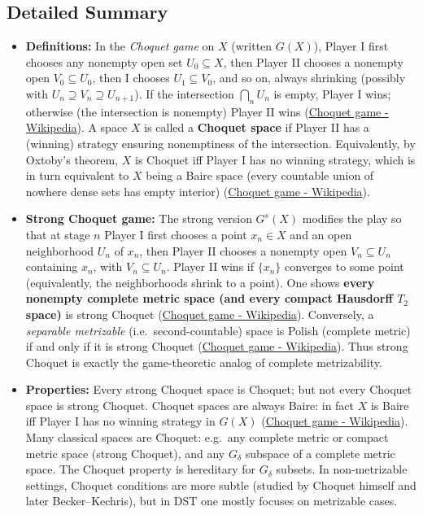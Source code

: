 \documentclass[11pt]{article}
\begin{document}
\subsection{Detailed Summary}
\label{detailed-summary-2}
\begin{itemize}
\item \textbf{Definitions:} In the \emph{Choquet game} on \(X\) (written \(G(X)\)),
Player I first chooses any nonempty open set \(U_0\subseteq X\), then
Player II chooses a nonempty open \(V_0\subseteq U_0\), then I chooses
\(U_1\subseteq V_0\), and so on, always shrinking (possibly with
\(U_n\supseteq V_n\supseteq U_{n+1}\)). If the intersection
\(\bigcap_{n}U_n\) is empty, Player I wins; otherwise (the
intersection is nonempty) Player II wins
(\href{https://en.wikipedia.org/wiki/Choquet\_game\#:\~:text=,wins\%2C\%20otherwise\%20Player\%20II\%20wins}{Choquet
game - Wikipedia}). A space \(X\) is called a \textbf{Choquet space} if
Player II has a (winning) strategy ensuring nonemptiness of the
intersection. Equivalently, by Oxtoby's theorem, \(X\) is Choquet iff
Player I has no winning strategy, which is in turn equivalent to \(X\)
being a Baire space (every countable union of nowhere dense sets has
empty interior)
(\href{https://en.wikipedia.org/wiki/Choquet\_game\#:\~:text=if\%20Player\%20I\%20has\%20no,that\%20are}{Choquet
game - Wikipedia}).

\item \textbf{Strong Choquet game:} The strong version \(G^s(X)\) modifies the play
so that at stage \(n\) Player I first chooses a point \(x_n\in X\) and
an open neighborhood \(U_n\) of \(x_n\), then Player II chooses a
nonempty open \(V_n\subseteq U_n\) containing \(x_n\), with
\(V_n\subseteq U_n\). Player II wins if \(\{x_n\}\) converges to some
point (equivalently, the neighborhoods shrink to a point). One shows
\textbf{every nonempty complete metric space (and every compact Hausdorff
\(T_2\) space)} is strong Choquet
(\href{https://en.wikipedia.org/wiki/Choquet\_game\#:\~:text=All\%20nonempty\%20complete\%20metric\%20spaces,displaystyle}{Choquet
game - Wikipedia}). Conversely, a \emph{separable metrizable}
(i.e. second-countable) space is Polish (complete metric) if and only
if it is strong Choquet
(\href{https://en.wikipedia.org/wiki/Choquet\_game\#:\~:text=All\%20nonempty\%20complete\%20metric\%20spaces,displaystyle}{Choquet
game - Wikipedia}). Thus strong Choquet is exactly the game-theoretic
analog of complete metrizability.

\item \textbf{Properties:} Every strong Choquet space is Choquet; but not every
Choquet space is strong Choquet. Choquet spaces are always Baire: in
fact \(X\) is Baire iff Player I has no winning strategy in \(G(X)\)
(\href{https://en.wikipedia.org/wiki/Choquet\_game\#:\~:text=if\%20Player\%20I\%20has\%20no,that\%20are}{Choquet
game - Wikipedia}). Many classical spaces are Choquet: e.g. any
complete metric or compact metric space (strong Choquet), and any
\(G_\delta\) subspace of a complete metric space. The Choquet property
is hereditary for \(G_\delta\) subsets. In non-metrizable settings,
Choquet conditions are more subtle (studied by Choquet himself and
later Becker--Kechris), but in DST one mostly focuses on metrizable
cases.


\end{itemize}
\end{document}
